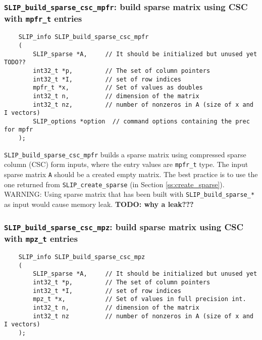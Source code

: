 \documentclass[12pt]{article}
\theoremstyle{definition}
\begin{document}
\cprotect\subsubsection{\verb|SLIP_build_sparse_csc_mpfr|: build sparse matrix using CSC with \verb|mpfr_t| entries}
\label{s:user:build_sparse_csc_mpfr}

\begin{mdframed}[userdefinedwidth=6in]
{\footnotesize
\begin{verbatim}
    SLIP_info SLIP_build_sparse_csc_mpfr
    (
        SLIP_sparse *A,     // It should be initialized but unused yet TODO??
        int32_t *p,         // The set of column pointers
        int32_t *I,         // set of row indices
        mpfr_t *x,          // Set of values as doubles
        int32_t n,          // dimension of the matrix
        int32_t nz,         // number of nonzeros in A (size of x and I vectors)
        SLIP_options *option  // command options containing the prec for mpfr
    );
\end{verbatim}
} \end{mdframed}

\verb|SLIP_build_sparse_csc_mpfr| builds a sparse matrix using compressed
sparse column (CSC) form inputs, where the entry values are \verb|mpfr_t| type.
The input sparse matrix \verb|A| should be a created empty matrix. The
best practice is to use the one returned from \verb|SLIP_create_sparse| (in
Section \ref{ss:create_sparse}). WARNING: Using sparse matrix that has been
built with \verb|SLIP_build_sparse_*| as input would cause memory leak.
{\bf TODO: why a leak???} %

\cprotect\subsubsection{\verb|SLIP_build_sparse_csc_mpz|: build sparse matrix using CSC with \verb|mpz_t| entries}
\label{s:user:build_sparse_csc_mpz}

\begin{mdframed}[userdefinedwidth=6in]
{\footnotesize
\begin{verbatim}
    SLIP_info SLIP_build_sparse_csc_mpz
    (
        SLIP_sparse *A,     // It should be initialized but unused yet
        int32_t *p,         // The set of column pointers
        int32_t *I,         // set of row indices
        mpz_t *x,           // Set of values in full precision int.
        int32_t n,          // dimension of the matrix
        int32_t nz          // number of nonzeros in A (size of x and I vectors)
    );
\end{verbatim}
} \end{mdframed}
\end{document}
